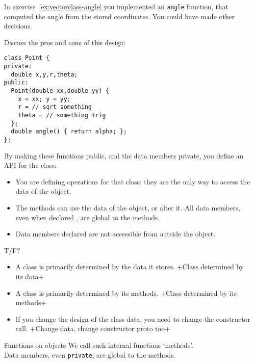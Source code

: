 In exercise~\ref{ex:vectorclass-angle} you implemented an \lstinline{angle} function,
that computed the angle from the stored coordinates.
You could have made other decisions.

\begin{exercise}
  \label{ex:vectorclass-redundant}
  Discuss the pros and cons of this design:
  \lstset{style=snippetcode}
\begin{lstlisting}
class Point {
private:
  double x,y,r,theta;
public:
  Point(double xx,double yy) {
    x = xx; y = yy;
    r = // sqrt something
    theta = // something trig
  };
  double angle() { return alpha; };
};
\end{lstlisting}
\end{exercise}

By making these functions public, and the data members
private, you define an \acf{API} for the class:
\begin{itemize}
\item You are defining operations for that class; they are the only
  way to access the data of the object.
\item The methods can use the data of the object, or alter it. All
  data members, even when declared , are global to the methods.
\item  Data members declared  are not accessible from outside the
  object.
\end{itemize}

\begin{review}
  \label{rev:class-meth-data}
  T/F?
  \begin{itemize}
  \item A class is primarily determined by the data it stores.
    \slackpollTF+Class determined by its data+
  \item A class is primarily determined by its methods.
    \slackpollTF+Class determined by its methods+
  \item If you change the design of the class data,
    you need to change the constructor call.
    \slackpollTF+Change data, change constructor proto too+
  \end{itemize}
\end{review}

\begin{slide}{Functions on objects}
  \label{sl:obj-func}
  We call such internal functions `methods'.\\
  Data members, even \lstinline{private}, are global to the methods.
\end{slide}

